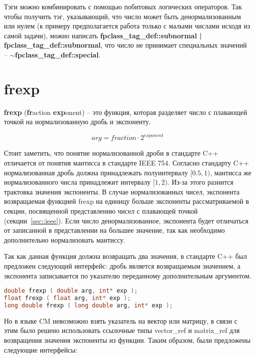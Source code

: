 Тэги можно комбинировать с помощью побитовых логических операторов.
Так чтобы получить тэг, указывающий, что число может быть денормализованным или нулем (к примеру предполагается работа только с малыми числами исходя из самой задачи), можно написать \textbf{fpclass\_tag\_def::subnormal | fpclass\_tag\_def::subnormal}, что число не принимает специальных значений -- \textbf{$\sim$fpclass\_tag\_def::special}.

\section{frexp}

\textbf{frexp} (\textbf{fr}action \textbf{exp}onent) -- это функция, которая разделяет число с плавающей точкой на нормализованную дробь и экспоненту.

\begin{equation*}
    arg = fraction \cdot 2^{exponent}
\end{equation*}

Стоит заметить, что понятие нормализованной дроби в стандарте C++ отличается от понятия мантисса в стандарте IEEE 754.
Согласно стандарту C++ нормализованная дробь должна принадлежать полуинтервалу $[0.5, 1)$, мантисса же нормализованного числа принадлежит интервалу $[1, 2)$.
Из-за этого разнится трактовка значения экспоненты.
В случае нормализованных чисел, экспонента возвращаемая функцией frexp на единицу больше экспоненты рассматриваемой в секции, посвященной представлению чисел с плавающей точкой (секции~\ref{sec::ieee}).
Если число денормализованное, экспонента будет отличаться от записанной в представлении на большее значение, так как необходимо дополнительно нормализовать мантиссу.

Так как данная функция должна возвращать два значения, в стандарте C++ был предложен следующий интерфейс: дробь является возвращаемым значением, а экспонента записывается по указателю переданному дополнительным аргументом.

\begin{lstlisting}[caption={Объявления перегрузок функции frexp согласно стандарту C++ 2011},captionpos=b,language=C++]
double frexp ( double arg, int* exp );
float frexp ( float arg, int* exp );
long double frexp ( long double arg, int* exp );
\end{lstlisting}

Но в языке CM невозможно взять указатель на вектор или матрицу, в связи с этим было решено использовать ссылочные типы vector\_ref и matrix\_ref для возвращения значения экспоненты из функции.
Таким образом, были предложены следующие интерфейсы:

